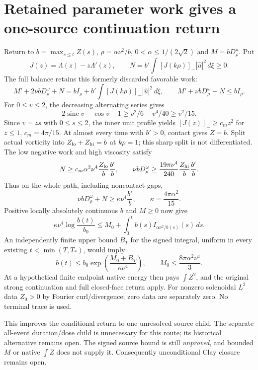 \documentclass[11pt]{article}
\begin{document}
\section{Retained parameter work gives a one-source continuation return}
Return to $b=\max_{s\le t}Z(s)$, $\rho=\alpha\nu^2/b$,
$0<\alpha\le1/(2\sqrt2)$ and $M=bD^u_\rho$. Put
\[
 J(z)=\Lambda(z)-z\Lambda'(z),\qquad
 N=b'\int[J(k\rho)]_-|\widehat u|^2\,d\xi\ge0.
\]
The full balance retains this formerly discarded favorable work:
\[
 M'+2\nu bD^\omega_\rho+N
 =bI_\rho+b'\int[J(k\rho)]_+|\widehat u|^2\,d\xi,
 \qquad M'+\nu bD^\omega_\rho+N\le bI_\rho.
\]
For $0\le v\le2$, the decreasing alternating series gives
\[
 2\operatorname{sinc}v-\cos v-1
 \ge v^2/6-v^4/40\ge v^2/15.
\]
Since $v=zs$ with $0\le s\le2$, the inner unit profile yields
$[J(z)]_-\ge c_mz^2$ for $z\le1$, $c_m=4\pi/15$.
At almost every time with $b'>0$, contact gives $Z=b$. Split actual
vorticity into $Z_{\rm lo}+Z_{\rm hi}=b$ at $k\rho=1$; this sharp split is
not differentiated. The low negative work and high viscosity satisfy
\[
 N\ge c_m\alpha^2\nu^4\frac{Z_{\rm lo}}b\frac{b'}b,
 \qquad
 \nu bD^\omega_\rho\ge\frac{19\pi\nu^4}{240}
                      \frac{Z_{\rm hi}}b\frac{b'}b.
\]
Thus on the whole path, including noncontact gaps,
\[
 \nu bD^\omega_\rho+N\ge\kappa\nu^4\frac{b'}b,
 \qquad\kappa=\frac{4\pi\alpha^2}{15}.
\]
Positive locally absolutely continuous $b$ and $M\ge0$ now give
\[
 \kappa\nu^4\log\frac{b(t)}{b_0}
 \le M_0+\int_0^t b(s)I_{\alpha\nu^2/b(s)}(s)\,ds.
\]
An independently finite upper bound $B_T$ for the signed integral, uniform
in every existing $t<\min(T,T_*)$, would imply
\[
 b(t)\le b_0\exp\!\left(\frac{M_0+B_T}{\kappa\nu^4}\right),
 \qquad M_0\le\frac{8\pi\alpha^2\nu^4}{3}.
\]
At a hypothetical finite endpoint native energy then pays $\int Z^2$,
and the original strong continuation and full closed-face return apply.
For nonzero solenoidal $L^2$ data $Z_0>0$ by Fourier curl/divergence;
zero data are separately zero. No terminal trace is used.

This improves the conditional return to one unresolved source child.
The separate all-event duration/dose child is unnecessary for this route;
its historical alternative remains open. The signed source bound is still
\emph{unproved}, and bounded $M$ or native $\int Z$ does not supply it.
Consequently unconditional Clay closure remains open.
\end{document}
